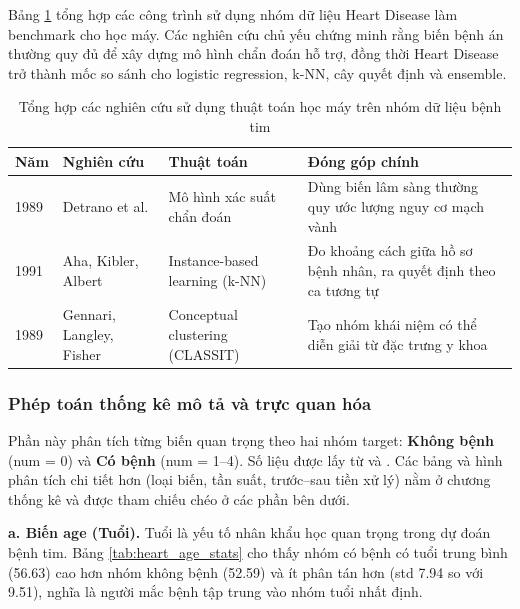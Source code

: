 Bảng \ref{tab:heart_research_review} tổng hợp các công trình sử dụng nhóm dữ liệu Heart Disease làm benchmark cho học máy. Các nghiên cứu chủ yếu chứng minh rằng biến bệnh án thường quy đủ để xây dựng mô hình chẩn đoán hỗ trợ, đồng thời Heart Disease trở thành mốc so sánh cho logistic regression, k-NN, cây quyết định và ensemble.

\begin{table}[H]
\centering
\caption{Tổng hợp các nghiên cứu sử dụng thuật toán học máy trên nhóm dữ liệu bệnh tim}
\label{tab:heart_research_review}
\small
\begin{tabular}{p{}p{}p{}p{}}
\toprule
Năm & Nghiên cứu & Thuật toán & Đóng góp chính \\
\midrule
1989 & Detrano et al. \cite{Detrano1989HeartDisease} & Mô hình xác suất chẩn đoán & Dùng biến lâm sàng thường quy ước lượng nguy cơ mạch vành \\
1991 & Aha, Kibler, Albert \cite{Aha1991InstanceBased} & Instance-based learning (k-NN) & Đo khoảng cách giữa hồ sơ bệnh nhân, ra quyết định theo ca tương tự \\
1989 & Gennari, Langley, Fisher \cite{Gennari1989CLASSIT} & Conceptual clustering (CLASSIT) & Tạo nhóm khái niệm có thể diễn giải từ đặc trưng y khoa \\
\bottomrule
\end{tabular}
\end{table}

\subsubsection{Phép toán thống kê mô tả và trực quan hóa}

Phần này phân tích từng biến quan trọng theo hai nhóm target: \textbf{Không bệnh} (num = 0) và \textbf{Có bệnh} (num = 1--4). Số liệu được lấy từ  và . Các bảng và hình phân tích chi tiết hơn (loại biến, tần suất, trước--sau tiền xử lý) nằm ở chương thống kê và được tham chiếu chéo ở các phần bên dưới.

\textbf{a. Biến age (Tuổi).} Tuổi là yếu tố nhân khẩu học quan trọng trong dự đoán bệnh tim. Bảng \ref{tab:heart_age_stats} cho thấy nhóm có bệnh có tuổi trung bình (56.63) cao hơn nhóm không bệnh (52.59) và ít phân tán hơn (std 7.94 so với 9.51), nghĩa là người mắc bệnh tập trung vào nhóm tuổi nhất định.

